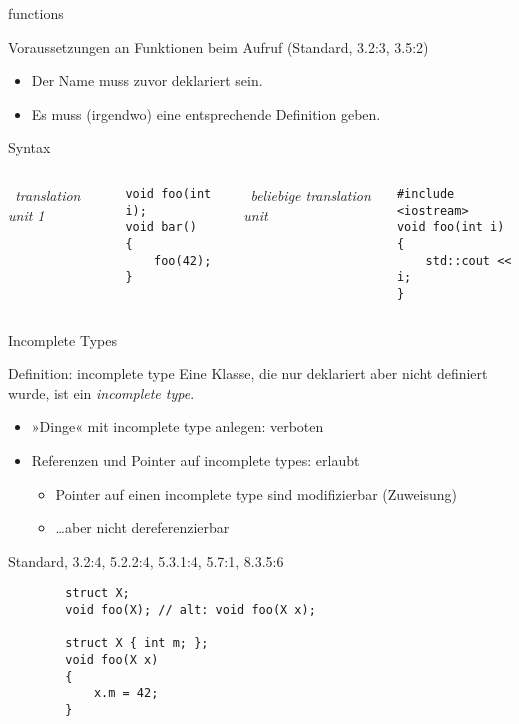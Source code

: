 \begin{frame}[fragile]{functions}
	\begin{block}{Voraussetzungen an Funktionen beim Aufruf (Standard, 3.2:3, 3.5:2)}
		\begin{itemize}
			\item Der Name muss zuvor deklariert sein.
			\item Es muss (irgendwo) eine entsprechende Definition geben.
		\end{itemize}
	\end{block}
	
	\begin{block}{Syntax}
		\hspace{1em}
		\begin{columns}[t]
				\emph{\ translation unit 1}
				\vspace{0.5em}
			\begin{lstlisting}
void foo(int i);
void bar()
{
    foo(42);
}
			\end{lstlisting}
			
				\emph{\ beliebige translation unit}
				\vspace{0.5em}
			\begin{lstlisting}
#include <iostream>
void foo(int i)
{
    std::cout << i;
}
			\end{lstlisting}
		\end{columns}
	\end{block}
\end{frame}


\begin{frame}[fragile]{Incomplete Types}
	\begin{block}{Definition: incomplete type}
		Eine Klasse, die nur deklariert aber nicht definiert wurde, ist ein \emph{incomplete type}.
	\end{block}
	
	\pause
	
	\begin{itemize}
		\item »Dinge« mit incomplete type anlegen: verboten
		\item Referenzen und Pointer auf incomplete types: erlaubt
		\begin{itemize}
			\item Pointer auf einen incomplete type sind modifizierbar (Zuweisung)
			\item \dots aber nicht dereferenzierbar
		\end{itemize}
	\end{itemize}
	
	\tiny{Standard, 3.2:4, 5.2.2:4, 5.3.1:4, 5.7:1, 8.3.5:6}
	
	\pause
	
	\begin{lstlisting}
		struct X;
		void foo(X); // alt: void foo(X x);
		
		struct X { int m; };
		void foo(X x)
		{
		    x.m = 42;
		}
	\end{lstlisting}
\end{frame}


